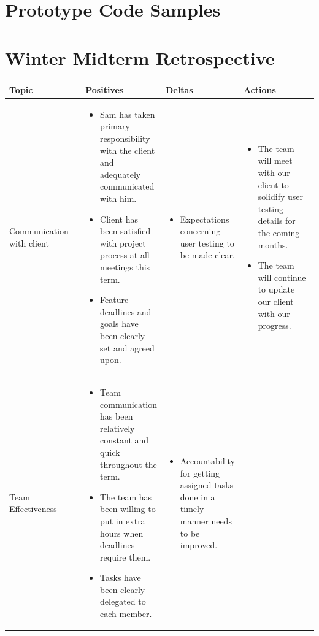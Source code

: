 \documentclass[letterpaper,10pt,titlepage,draftclsnofoot,onecolumn,onesided] {IEEEtran}
\begin{document}
\section{Prototype Code Samples}	

\pagebreak
\section{Winter Midterm Retrospective}
	\begin{center}
	\begin{singlespace}
		\begin{tabular}{ |  p{0.25\linewidth}  |  p{0.25\linewidth}  | p{0.25\linewidth} | p{0.25\linewidth} |}
		\hline
		Topic & Positives & Deltas & Actions \\ \hline
		
			Communication with client 
		& 
			\begin{itemize}
				\item Sam has taken primary responsibility with the client and adequately communicated with him.
				\item Client has been satisfied with project process at all meetings this term.
				\item Feature deadlines and goals have been clearly set and agreed upon.
			\end{itemize}
		& 
			\begin{itemize}
				\item Expectations concerning user testing to be made clear.
			\end{itemize}
		&
			\begin{itemize}
				\item The team will meet with our client to solidify user testing details for the coming months.
				\item The team will continue to update our client with our progress.
			\end{itemize} 
		\\ \hline
			Team Effectiveness 
		& 
			\begin{itemize}
				\item Team communication has been relatively constant and quick throughout the term.
				\item The team has been willing to put in extra hours when deadlines require them.
				\item Tasks have been clearly delegated to each member.
			\end{itemize}
		& 
			\begin{itemize}
				\item Accountability for getting assigned tasks done in a timely manner needs to be improved.

\end{itemize}
\end{tabular}
\end{singlespace}
\end{center}
\end{document}
